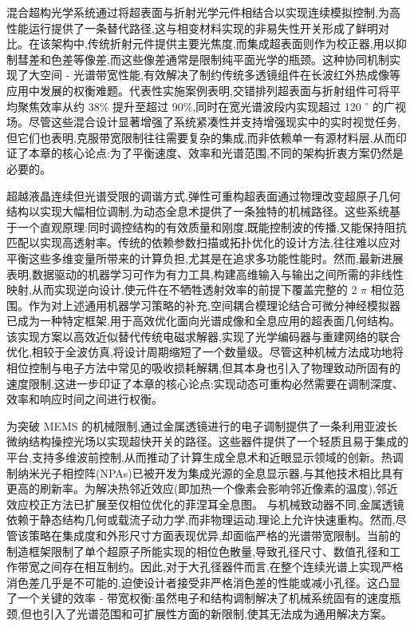 \documentclass[11pt]{article}
\begin{document}
混合超构光学系统通过将超表面与折射光学元件相结合以实现连续模拟控制,为高性能运行提供了一条替代路径,这与相变材料实现的非易失性开关形成了鲜明对比。在该架构中,传统折射元件提供主要光焦度,而集成超表面则作为校正器,用以抑制彗差和色差等像差,而这些像差通常是限制纯平面光学的瓶颈。这种协同机制实现了大空间 - 光谱带宽性能,有效解决了制约传统多透镜组件在长波红外热成像等应用中发展的权衡难题。代表性实施案例表明,交错排列超表面与折射组件可将平均聚焦效率从约 38\% 提升至超过 90\%,同时在宽光谱波段内实现超过 120 \(^\circ\) 的广视场。尽管这些混合设计显著增强了系统紧凑性并支持增强现实中的实时视觉任务,但它们也表明,克服带宽限制往往需要复杂的集成,而非依赖单一有源材料层,从而印证了本章的核心论点:为了平衡速度、效率和光谱范围,不同的架构折衷方案仍然是必要的。\citep{doi_10_1002_lpor_71431_d57da40c} \citep{doi_10_1364_ao_516890_6221deea}

超越液晶连续但光谱受限的调谐方式,弹性可重构超表面通过物理改变超原子几何结构以实现大幅相位调制,为动态全息术提供了一条独特的机械路径。这些系统基于一个直观原理:同时调控结构的有效质量和刚度,既能控制波的传播,又能保持阻抗匹配以实现高透射率。传统的依赖参数扫描或拓扑优化的设计方法,往往难以应对平衡这些多维变量所带来的计算负担,尤其是在追求多功能性能时。然而,最新进展表明,数据驱动的机器学习可作为有力工具,构建高维输入与输出之间所需的非线性映射,从而实现逆向设计,使元件在不牺牲透射效率的前提下覆盖完整的 2 \(\pi\) 相位范围。作为对上述通用机器学习策略的补充,空间耦合模理论结合可微分神经模拟器已成为一种特定框架,用于高效优化面向光谱成像和全息应用的超表面几何结构。该实现方案以高效近似替代传统电磁求解器,实现了光学编码器与重建网络的联合优化,相较于全波仿真,将设计周期缩短了一个数量级。尽管这种机械方法成功地将相位控制与电子方法中常见的吸收损耗解耦,但其本身也引入了物理致动所固有的速度限制,这进一步印证了本章的核心论点:实现动态可重构必然需要在调制深度、效率和响应时间之间进行权衡。\citep{doi_10_1016_j_matdes_2022_111560_e69e3350} \citep{doi_10_1021_acsphotonics_4c00171_f68cb79c} \citep{s2_76a83ea3baed75ad88b7f0782eb9a694a330c853_cee16cac}

为突破 MEMS 的机械限制,通过金属透镜进行的电子调制提供了一条利用亚波长微纳结构操控光场以实现超快开关的路径。这些器件提供了一个轻质且易于集成的平台,支持多维波前控制,从而推动了计算生成全息术和近眼显示领域的创新。热调制纳米光子相控阵(NPAs)已被开发为集成光源的全息显示器,与其他技术相比具有更高的刷新率。为解决热邻近效应(即加热一个像素会影响邻近像素的温度),邻近效应校正方法已扩展至仅相位优化的菲涅耳全息图。\citep{doi_10_1109_vr50410_2021_00058_601721f7} 与机械致动器不同,金属透镜依赖于静态结构几何或载流子动力学,而非物理运动,理论上允许快速重构。然而,尽管该策略在集成度和外形尺寸方面表现优异,却面临严格的光谱带宽限制。当前的制造框架限制了单个超原子所能实现的相位色散量,导致孔径尺寸、数值孔径和工作带宽之间存在相互制约。因此,对于大孔径器件而言,在整个连续光谱上实现严格消色差几乎是不可能的,迫使设计者接受非严格消色差的性能或减小孔径。这凸显了一个关键的效率 - 带宽权衡:虽然电子和结构调制解决了机械系统固有的速度瓶颈,但也引入了光谱范围和可扩展性方面的新限制,使其无法成为通用解决方案。\citep{doi_10_1038_s41377_026_02272_y_42e58df2}
\end{document}
